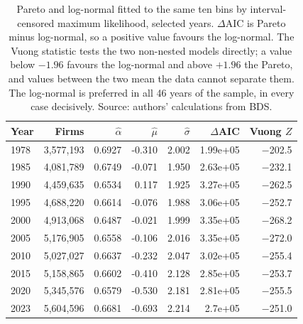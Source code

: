 \begin{table}[H]
\caption{Pareto and log-normal fitted to the same ten bins by interval-censored maximum
likelihood, selected years. $\Delta$AIC is Pareto minus log-normal, so a positive value
favours the log-normal. The Vuong statistic tests the two non-nested models directly; a
value below $-1.96$ favours the log-normal and above $+1.96$ the Pareto, and values
between the two mean the data cannot separate them. The log-normal is preferred in all
46 years of the sample, in every case decisively. Source: authors' calculations from BDS.}
\label{tab:model_comparison}
\begin{tabular}{lrrrrrr}
\toprule
Year & Firms & $\hat\alpha$ & $\hat\mu$ & $\hat\sigma$ & $\Delta$AIC & Vuong $Z$ \\
\midrule
1978 & 3,577,193 & 0.6927 & -0.310 & 2.002 & 1.99e+05 & $-$202.5 \\
1985 & 4,081,789 & 0.6749 & -0.071 & 1.950 & 2.63e+05 & $-$232.1 \\
1990 & 4,459,635 & 0.6534 & 0.117 & 1.925 & 3.27e+05 & $-$262.5 \\
1995 & 4,688,220 & 0.6614 & -0.076 & 1.988 & 3.06e+05 & $-$252.7 \\
2000 & 4,913,068 & 0.6487 & -0.021 & 1.999 & 3.35e+05 & $-$268.2 \\
2005 & 5,176,905 & 0.6558 & -0.106 & 2.016 & 3.35e+05 & $-$272.0 \\
2010 & 5,027,027 & 0.6637 & -0.232 & 2.047 & 3.02e+05 & $-$255.4 \\
2015 & 5,158,865 & 0.6602 & -0.410 & 2.128 & 2.85e+05 & $-$253.7 \\
2020 & 5,345,576 & 0.6579 & -0.530 & 2.181 & 2.81e+05 & $-$255.5 \\
2023 & 5,604,596 & 0.6681 & -0.693 & 2.214 & 2.7e+05 & $-$251.0 \\
\bottomrule
\end{tabular}
\end{table}
